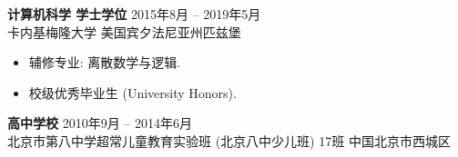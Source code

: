 \documentclass[margin, 10pt]{res} %
\begin{document}
\begin{resume}
{\bf 计算机科学\; 学士学位} \hfill 2015年8月 -- 2019年5月 \\
卡内基梅隆大学 \hfill 美国宾夕法尼亚州匹兹堡

\begin{itemize}
\item 辅修专业: 离散数学与逻辑.
\item 校级优秀毕业生 (University Honors).
\end{itemize} 

{\bf 高中学校} \hfill 2010年9月 -- 2014年6月 \\
北京市第八中学超常儿童教育实验班 (北京八中少儿班) 17班 \hfill 中国北京市西城区







\end{resume}
\end{document}
